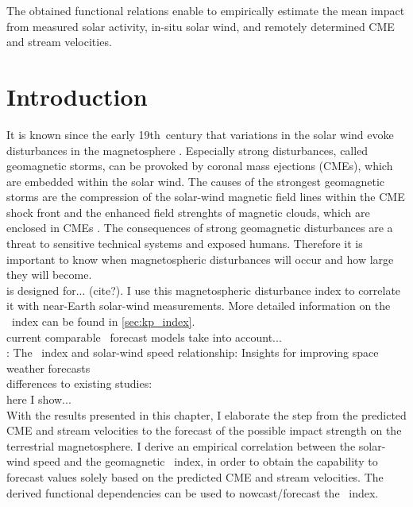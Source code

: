 The obtained functional relations enable to empirically estimate the mean \Kp{} impact from measured solar activity, in-situ solar wind, and remotely determined CME and stream velocities.



\section{Introduction}
It is known since the early 19th~century that variations in the solar wind evoke disturbances in the magnetosphere \citep{Bartels1962}. Especially strong disturbances, called geomagnetic storms, can be provoked by coronal mass ejections (CMEs), which are embedded within the solar wind. The causes of the strongest geomagnetic storms are the compression of the solar-wind magnetic field lines within the CME shock front and the enhanced field strenghts of magnetic clouds, which are enclosed in CMEs \citep{Bothmer1993}. The consequences of strong geomagnetic disturbances are a threat to sensitive technical systems and exposed humans. Therefore it is important to know when magnetospheric disturbances will occur and how large they will become.\\

\Kp{} is designed for... (cite?). I use this magnetospheric disturbance index to correlate it with near-Earth solar-wind measurements. More detailed information on the \Kp{}~index can be found in \autoref{sec:kp_index}.\\

current comparable \Kp~forecast models take into account...\\
\citet{Elliott2013}: The \Kp~index and solar-wind speed relationship: Insights for improving space weather forecasts\\
differences to existing studies:\\
here I show...\\

With the results presented in this chapter, I elaborate the step from the predicted CME and stream velocities to the forecast of the possible impact strength on the terrestrial magnetosphere. I derive an empirical correlation between the solar-wind speed and the geomagnetic \Kp~index, in order to obtain the capability to forecast \Kp{} values solely based on the predicted CME and stream velocities. The derived functional dependencies can be used to nowcast/forecast the \Kp~index.\\

